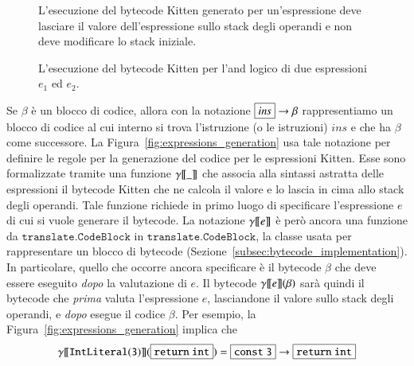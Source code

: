 \begin{figure}[t]
\begin{center}
\end{center}
\caption{L'esecuzione del bytecode Kitten generato per un'espressione deve lasciare il valore dell'espressione sullo stack degli operandi e non deve modificare lo stack iniziale.}
  \label{fig:russian}
\end{figure}
%
\begin{figure}[t]
\begin{center}
\end{center}
\caption{L'esecuzione del bytecode Kitten per l'and logico di due espressioni $e_1$ ed $e_2$.}
  \label{fig:russian_relevance}
\end{figure}

Se $\beta$ \`e un blocco di codice, allora con la notazione
$\fbox{$\mathit{ins}$}\to\beta$
rappresentiamo un blocco di codice
al cui interno si trova l'istruzione (o le istruzioni) $\mathit{ins}$
e che ha $\beta$ come successore.
La Figura~\ref{fig:expressions_generation} usa tale notazione per
definire le regole per la
generazione del codice per le espressioni Kitten. Esse sono formalizzate
tramite una funzione ${\gamma[\![{\_}]\!]}$ che associa alla sintassi astratta
delle espressioni il bytecode Kitten che ne calcola il valore e lo lascia
in cima allo stack degli operandi.
Tale funzione richiede in primo luogo di specificare l'espressione $e$
di cui si vuole generare il bytecode. La notazione ${\gamma[\![{e}]\!]}$ \`e
per\`o ancora una funzione da $\mathtt{translate.CodeBlock}$ in
$\mathtt{translate.CodeBlock}$, \cioe la classe usata per
rappresentare un blocco di bytecode
(Sezione~\ref{subsec:bytecode_implementation}). In particolare, quello che
occorre ancora specificare \`e il bytecode $\beta$
che deve essere eseguito \emph{dopo} la valutazione di $e$.
Il bytecode ${\gamma[\![{e}]\!]}(\beta)$ sar\`a quindi il bytecode che \emph{prima}
valuta l'espressione $e$, lasciandone il valore sullo stack degli operandi,
e \emph{dopo} esegue il codice $\beta$. Per esempio, la
Figura~\ref{fig:expressions_generation} implica che
\[
  \gen{\mathtt{IntLiteral(3)}}(\fbox{$\mathtt{return\ int}$})
    =\fbox{$\mathtt{const\ 3}$}\to\fbox{$\mathtt{return\ int}$}
\]

